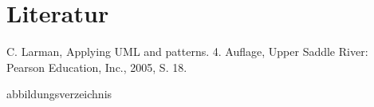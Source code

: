 \documentclass[a4paper,10pt,xetex]{article}
\begin{document}
\section{Literatur}\label{literatur}
\begingroup
\renewcommand{\section}[2]{}%
  \begin{thebibliography}{9}
     C. Larman, Applying UML and patterns. 4. Auflage, Upper Saddle River: Pearson Education, Inc., 2005, S. 18.
  \end{thebibliography}
\endgroup

\section{Abbildungsverzeichnis}\label{abbildungsverzeichnis}
\begingroup
\renewcommand{\section}[2]{}%
\hypersetup{linkcolor=black}
\listoffigures
\endgroup
\end{document}
